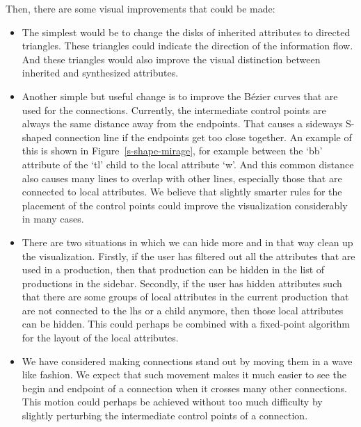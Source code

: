 \documentclass[11pt]{article}
\begin{document}
Then, there are some visual improvements that could be made:
\begin{itemize}
  \item The simplest would be to change the disks of inherited attributes to directed triangles. These triangles could indicate the direction of the information flow. And these triangles would also improve the visual distinction between inherited and synthesized attributes.
  \item Another simple but useful change is to improve the Bézier curves that are used for the connections. Currently, the intermediate control points are always the same distance away from the endpoints. That causes a sideways S-shaped connection line if the endpoints get too close together. An example of this is shown in Figure~\ref{s-shape-mirage}, for example between the `bb' attribute of the `tl' child to the local attribute `w'. And this common distance also causes many lines to overlap with other lines, especially those that are connected to local attributes. We believe that slightly smarter rules for the placement of the control points could improve the visualization considerably in many cases.
  \item There are two situations in which we can hide more and in that way clean up the visualization. Firstly, if the user has filtered out all the attributes that are used in a production, then that production can be hidden in the list of productions in the sidebar. Secondly, if the user has hidden attributes such that there are some groups of local attributes in the current production that are not connected to the lhs or a child anymore, then those local attributes can be hidden. This could perhaps be combined with a fixed-point algorithm for the layout of the local attributes.
  \item We have considered making connections stand out by moving them in a wave like fashion. We expect that such movement makes it much easier to see the begin and endpoint of a connection when it crosses many other connections. This motion could perhaps be achieved without too much difficulty by slightly perturbing the intermediate control points of a connection.
\end{itemize}
\end{document}
